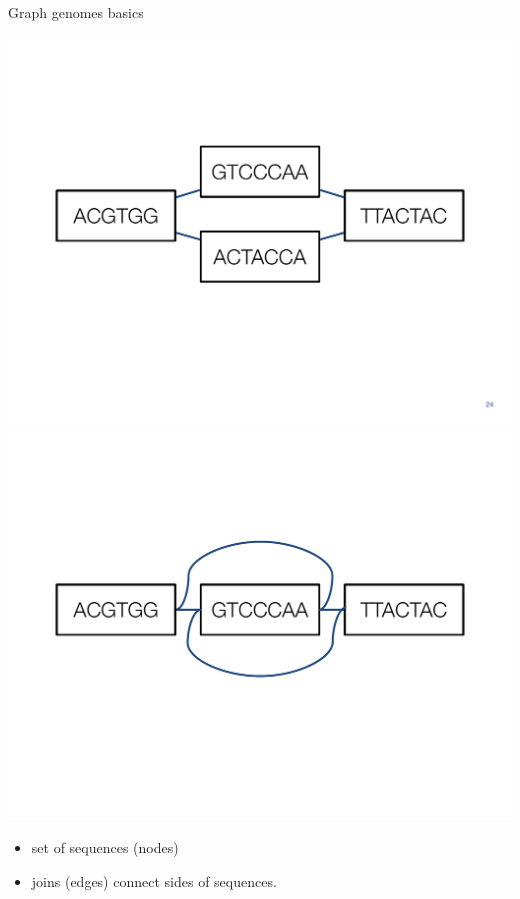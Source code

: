 \documentclass[10pt,
               hyperref={bookmarks=false,
                         bookmarksopen=false,
                         colorlinks=true,
                         linkcolor=blue,
                         urlcolor=blue},
               xcolor={svgnames,table}]{beamer}
\begin{document}
\begin{frame}{Graph genomes basics}
  \begin{center}
    \includegraphics[scale=0.30]{images/graph-genome-alt.pdf} \\
    \includegraphics[scale=0.30]{images/graph-genome-inversion.pdf}
  \end{center}
  \begin{itemize}
  \item set of sequences (nodes)
  \item joins (edges) connect sides of sequences.
  \end{itemize}
\end{frame}
\end{document}
